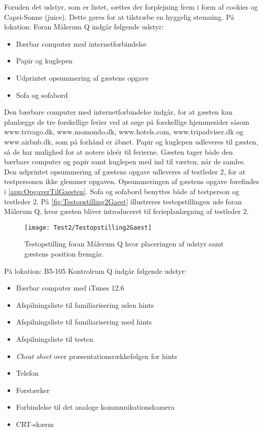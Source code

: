 Foruden det udstyr, som er listet, sættes der forplejning frem i form af cookies og Capri-Sonne (juice). Dette gøres for at tilstræbe en hyggelig stemning. \blankline  
%
På lokation: Foran Målerum Q indgår følgende udstyr: 
\begin{itemize}
  \item Bærbar computer med internetforbindelse 
  \item Papir og kuglepen 
  \item Udprintet opsummering af gæstens opgave
  \item Sofa og sofabord\blankline
\noindent
\end{itemize}
%
Den bærbare computer med internetforbindelse indgår, for at gæsten kan planlægge de tre forskellige ferier ved at søge på forskellige hjemmesider såsom www.trivago.dk, www.momondo.dk, www.hotels.com, www.tripadviser.dk og www.airbnb.dk, som på forhånd er åbnet. Papir og kuglepen udleveres til gæsten, så de har mulighed for at notere ideér til ferierne. Gæsten tager både den bærbare computer og papir samt kuglepen med ind til værten, når de samles. Den udprintet opsummering af gæstens opgave udleveres af testleder 2, for at testpersonen ikke glemmer opgaven. Opsummeringen af gæstens opgave forefindes i \autoref{app:OpgaverTilGaesten}. Sofa og sofabord benyttes både af testperson og testleder 2. På \autoref{fig:Testopstilling2Gaest} illustreres testopstillingen ude foran Målerum Q, hvor gæsten bliver introduceret til ferieplanlægning af testleder 2.  
%
\begin{figure}[H]
	\centering
	\texttt{[image: Test2/Testopstilling2Gaest]}
	\caption{Testopstilling foran Målerum Q hvor placeringen af udstyr samt gæstens position fremgår.}
	\label{fig:Testopstilling2Gaest}
\end{figure}
\noindent
% 
På lokation: B5-105 Kontrolrum Q indgår følgende udstyr:
\begin{itemize}
  \item Bærbar computer med iTunes 12.6
  \item Afspilningsliste til familiarisering uden hints 
  \item Afspilningsliste til familiarisering med hints
  \item Afspilningsliste til testen
  \item \textit{Cheat sheet} over præsentationsrækkefølgen for hints 
  \item Telefon
  \item Forstærker 
  \item Forbindelse til det analoge kommunikationskamera
  \item CRT-skærm \blankline
\noindent
\end{itemize}
